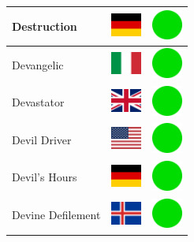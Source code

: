 \documentclass[12pt, a4paper, twoside]{report}
\begin{document}
\begin{center}
\begin{longtable}{|p{5cm}|p{2cm}|p{2cm}|}
 Destruction                                                & \includegraphics[width=1cm]{../4x3/de} &   \includegraphics[width=1cm]{../likes/y} \\ \hline
 Devangelic                                                 & \includegraphics[width=1cm]{../4x3/it} &   \includegraphics[width=1cm]{../likes/y} \\ \hline
 Devastator                                                 & \includegraphics[width=1cm]{../4x3/gb} &   \includegraphics[width=1cm]{../likes/y} \\ \hline
 Devil Driver                                               & \includegraphics[width=1cm]{../4x3/us} &   \includegraphics[width=1cm]{../likes/y} \\ \hline
 Devil's Hours                                              & \includegraphics[width=1cm]{../4x3/de} &   \includegraphics[width=1cm]{../likes/y} \\ \hline
 Devine Defilement                                          & \includegraphics[width=1cm]{../4x3/is} &   \includegraphics[width=1cm]{../likes/y} \\ \hline

\end{longtable}
\end{center}
\end{document}
